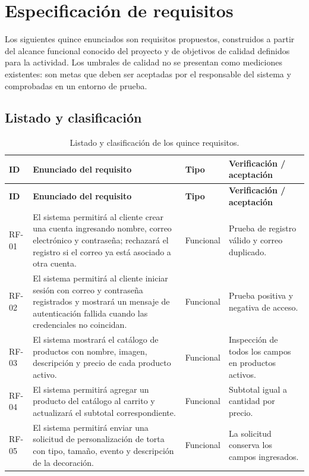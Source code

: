 \documentclass[11pt,a4paper]{article}
\begin{document}
\section{Especificación de requisitos}
Los siguientes quince enunciados son requisitos propuestos, construidos a partir del alcance funcional conocido del proyecto y de objetivos de calidad definidos para la actividad. Los umbrales de calidad no se presentan como mediciones existentes: son metas que deben ser aceptadas por el responsable del sistema y comprobadas en un entorno de prueba.

\subsection{Listado y clasificación}
\begin{longtable}{@{}L{0.08\textwidth} L{0.42\textwidth} L{0.15\textwidth} L{0.21\textwidth}@{}}
\caption{Listado y clasificación de los quince requisitos.}\label{tab:clasificacion}\\
\toprule
\textbf{ID} & \textbf{Enunciado del requisito} & \textbf{Tipo} & \textbf{Verificación / aceptación} \\
\midrule
\endfirsthead
\toprule
\textbf{ID} & \textbf{Enunciado del requisito} & \textbf{Tipo} & \textbf{Verificación / aceptación} \\
\midrule
\endhead
RF-01 & El sistema permitirá al cliente crear una cuenta ingresando nombre, correo electrónico y contraseña; rechazará el registro si el correo ya está asociado a otra cuenta. & Funcional & Prueba de registro válido y correo duplicado. \\
RF-02 & El sistema permitirá al cliente iniciar sesión con correo y contraseña registrados y mostrará un mensaje de autenticación fallida cuando las credenciales no coincidan. & Funcional & Prueba positiva y negativa de acceso. \\
RF-03 & El sistema mostrará el catálogo de productos con nombre, imagen, descripción y precio de cada producto activo. & Funcional & Inspección de todos los campos en productos activos. \\
RF-04 & El sistema permitirá agregar un producto del catálogo al carrito y actualizará el subtotal correspondiente. & Funcional & Subtotal igual a cantidad por precio. \\
RF-05 & El sistema permitirá enviar una solicitud de personalización de torta con tipo, tamaño, evento y descripción de la decoración. & Funcional & La solicitud conserva los campos ingresados. \\

\end{longtable}
\end{document}
